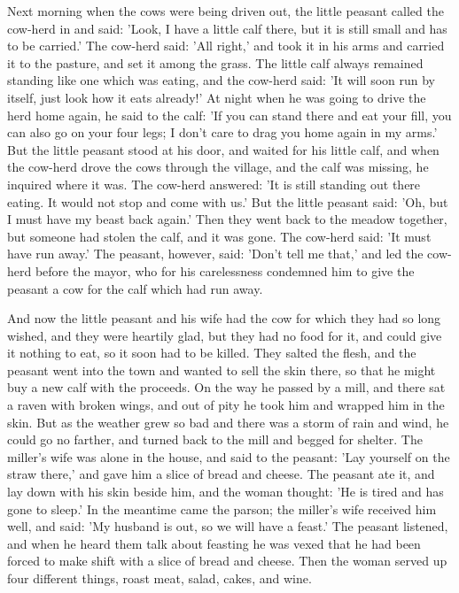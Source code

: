 \documentclass[12pt]{book}
\begin{document}
Next morning when the cows were being driven out, the little peasant
called the cow-herd in and said: 'Look, I have a little calf there,
but it is still small and has to be carried.' The cow-herd said: 'All
right,' and took it in his arms and carried it to the pasture, and set
it among the grass. The little calf always remained standing like one
which was eating, and the cow-herd said: 'It will soon run by itself,
just look how it eats already!' At night when he was going to drive
the herd home again, he said to the calf: 'If you can stand there and
eat your fill, you can also go on your four legs; I don't care to drag
you home again in my arms.' But the little peasant stood at his door,
and waited for his little calf, and when the cow-herd drove the cows
through the village, and the calf was missing, he inquired where it
was. The cow-herd answered: 'It is still standing out there eating. It
would not stop and come with us.' But the little peasant said: 'Oh,
but I must have my beast back again.' Then they went back to the
meadow together, but someone had stolen the calf, and it was gone. The
cow-herd said: 'It must have run away.' The peasant, however, said:
'Don't tell me that,' and led the cow-herd before the mayor, who for
his carelessness condemned him to give the peasant a cow for the calf
which had run away.

And now the little peasant and his wife had the cow for which they had
so long wished, and they were heartily glad, but they had no food for
it, and could give it nothing to eat, so it soon had to be killed.
They salted the flesh, and the peasant went into the town and wanted
to sell the skin there, so that he might buy a new calf with the
proceeds. On the way he passed by a mill, and there sat a raven with
broken wings, and out of pity he took him and wrapped him in the skin.
But as the weather grew so bad and there was a storm of rain and wind,
he could go no farther, and turned back to the mill and begged for
shelter. The miller's wife was alone in the house, and said to the
peasant: 'Lay yourself on the straw there,' and gave him a slice of
bread and cheese. The peasant ate it, and lay down with his skin
beside him, and the woman thought: 'He is tired and has gone to
sleep.' In the meantime came the parson; the miller's wife received
him well, and said: 'My husband is out, so we will have a feast.' The
peasant listened, and when he heard them talk about feasting he was
vexed that he had been forced to make shift with a slice of bread and
cheese. Then the woman served up four different things, roast meat,
salad, cakes, and wine.
\end{document}
